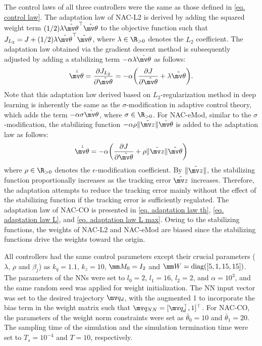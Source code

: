 \documentclass[letterpaper, 10 pt, conference]{ieeeconf}  %
\begin{document}
The control laws of all three controllers were the same as those defined in \eqref{eq. control law}.
The adaptation law of NAC-L2 is derived by adding the squared weight term $(1/2)\lambda{\hat{\mv\theta}}^\top {\hat{\mv\theta}}$ to the objective function such that $J_{L_2} = J+(1/2)\lambda{\hat{\mv\theta}}^\top {\hat{\mv\theta}}$, where $\lambda\in\R_{>0}$ denotes the $L_2$ coefficient.
The adaptation law obtained via the gradient descent method is subsequently adjusted by adding a stabilizing term $-\alpha\lambda{\hat{\mv\theta}}$ as follows:
\begin{equation} 
    \dot{{\hat{\mv\theta}}} = 
    {\partial J_{L_2}\over\partial {\hat{\mv\theta}}}
    =-\alpha
    \bigg(
        {\partial J\over\partial {\hat{\mv\theta}}}+\lambda{\hat{\mv\theta}}
    \bigg)
    .
    \label{eq. adap L2}
\end{equation}
Note that this adaptation law derived based on $L_2$-regularization method in deep learning is inherently the same as the $\sigma$-modification in adaptive control theory, which adds the term $-\alpha\sigma{\hat{\mv\theta}}$, where $\sigma\in\R_{>0}$.
For NAC-eMod, similar to the $\sigma$-modification, the stabilizing function $-\alpha\rho\Vert \tilde{\mv z} \Vert{\hat{\mv\theta}}$ is added to the adaptation law as follows:
\begin{equation}
    \dot{{\hat{\mv\theta}}} = -\alpha
    \bigg(
        {\partial J\over\partial {\hat{\mv\theta}}}+\rho\Vert\tilde {\mv z}\Vert{\hat{\mv\theta}}
    \bigg)
    \label{eq. adap eMod}
\end{equation}
where $\rho\in\R_{>0}$ denotes the $\epsilon$-modification coefficient.
By $\Vert\tilde {\mv z}\Vert$, the stabilizing function proportionally increases as the tracking error $\tilde {\mv z}$ increases.
Therefore, the adaptation attempts to reduce the tracking error mainly without the effect of the stabilizing function if the tracking error is sufficiently regulated.
The adaptation law of NAC-CO is presented in \eqref{eq. adaptation law th}, \eqref{eq. adaptation law L}, and \eqref{eq. adaptation law L max}.
Owing to the stabilizing functions, the weights of NAC-L2 and NAC-eMod are biased since the stabilizing functions drive the weights toward the origin.

All controllers had the same control parameters except their crucial parameters (\ie $\lambda$, $\rho$ and $\beta_j$) as $k_q=1.1$, $k_z=10$, $\mm M_0=I_2$ and $\mm W=\text{diag}([5,1,15,15])$.
The parameters of the NNs were set to $l_0=2$, $l_1=16$, $l_2=2$, and $\alpha=10^3$, and the same random seed was applied for weight initialization.
The NN input vector was set to the desired trajectory $\mv q_d$, with the augmented 1 to incorporate the bias term in the weight matrix such that $\mv q_{NN}=[\mv q_d^\top ,1]^\top $.
For NAC-CO, the parameters of the weight norm constraints were set as $\bar\theta_0=10$ and $\bar\theta_1=20$.
The sampling time of the simulation and the simulation termination time were set to $T_s=10^{-4}$ and $T=10$, respectively.
\end{document}
